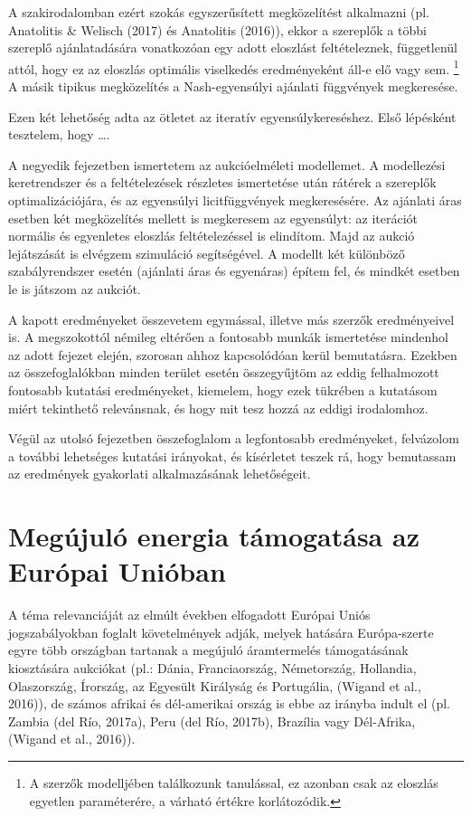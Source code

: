 \documentclass[twoside, magyar, showtrims]{corvinusphd}
\theoremstyle{plain}
\theoremstyle{remark}
\theoremstyle{definition}
\begin{document}
A szakirodalomban ezért szokás egyszerűsített megközelítést alkalmazni
(pl. Anatolitis \& Welisch (2017) és Anatolitis (2016)), ekkor
a szereplők a többi szereplő ajánlatadására vonatkozóan egy adott eloszlást feltételeznek,
függetlenül attól, hogy ez az eloszlás optimális viselkedés eredményeként áll-e elő vagy sem.
\footnote{A szerzők modelljében találkozunk tanulással, ez azonban csak az eloszlás
egyetlen paraméterére, a várható értékre korlátozódik.}
A másik tipikus megközelítés a Nash-egyensúlyi ajánlati függvények megkeresése.

Ezen két lehetőség adta az ötletet az iteratív egyensúlykereséshez.
Első lépésként tesztelem, hogy \ldots .

A negyedik fejezetben ismertetem az aukcióelméleti modellemet.
A modellezési keretrendszer és a feltételezések részletes ismertetése után rátérek
a szereplők optimalizációjára, és az egyensúlyi licitfüggvények megkeresésére.
Az ajánlati áras esetben két megközelítés mellett is megkeresem
az egyensúlyt: az iterációt normális és egyenletes eloszlás
feltételezéssel is elindítom.
Majd az aukció lejátszását is elvégzem szimuláció segítségével.
A modellt két különböző szabályrendszer esetén (ajánlati áras és egyenáras) építem fel,
és mindkét esetben le is játszom az aukciót. 

A kapott eredményeket összevetem egymással,
illetve más szerzők eredményeivel is.
A megszokottól némileg eltérően
a fontosabb munkák ismertetése
mindenhol az adott fejezet elején,
szorosan ahhoz kapcsolódóan kerül bemutatásra.
Ezekben az összefoglalókban minden
terület esetén összegyűjtöm az
eddig felhalmozott fontosabb kutatási eredményeket,
kiemelem, hogy ezek tükrében a kutatásom
miért tekinthető relevánsnak, és hogy mit tesz hozzá az eddigi irodalomhoz. 

Végül az utolsó fejezetben összefoglalom a legfontosabb eredményeket,
felvázolom a további lehetséges kutatási irányokat, és kísérletet teszek rá,
hogy bemutassam az eredmények gyakorlati alkalmazásának lehetőségeit.

\chapter{Megújuló energia támogatása az Európai Unióban}

\scwords A téma relevanciáját az elmúlt években elfogadott Európai Uniós jogszabályokban
foglalt követelmények adják, melyek hatására Európa-szerte egyre több országban
tartanak a megújuló áramtermelés támogatásának kiosztására
aukciókat (pl.: Dánia, Franciaország, Németország,
Hollandia, Olaszország, Írország, az Egyesült Királyság és Portugália,
(Wigand et al., 2016)), de számos afrikai és dél-amerikai ország
is ebbe az irányba indult el (pl. Zambia (del Río, 2017a),
Peru (del Río, 2017b), Brazília vagy Dél-Afrika, (Wigand et al., 2016)). 
\end{document}

